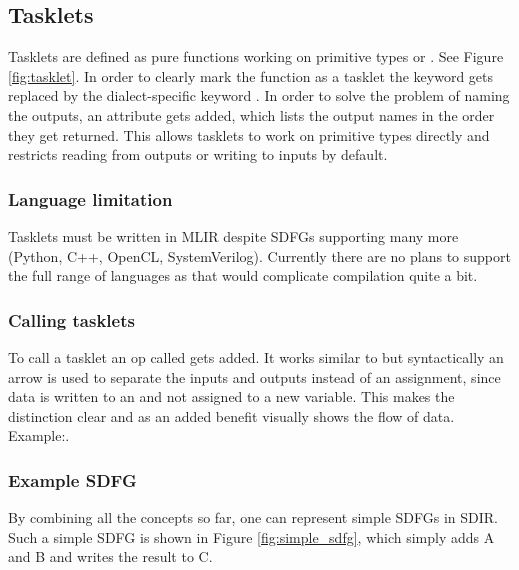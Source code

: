 \subsection{Tasklets} \label{section:tasklet}
Tasklets are defined as pure functions working on primitive types or . See Figure \ref{fig:tasklet}.
In order to clearly mark the function as a tasklet the keyword  gets replaced by the dialect-specific keyword . In order to solve the problem of naming the outputs, an attribute gets added, which lists the output names in the order they get returned. This allows tasklets to work on primitive types directly and restricts reading from outputs or writing to inputs by default.

\subsubsection{Language limitation}
Tasklets must be written in MLIR despite SDFGs supporting many more (Python, C++, OpenCL, SystemVerilog). Currently there are no plans to support the full range of languages as that would complicate compilation quite a bit.

\subsubsection{Calling tasklets}
To call a tasklet an op called  gets added. It works similar to  but syntactically an arrow is used to separate the inputs and outputs instead of an assignment, since data is written to an  and not assigned to a new variable. This makes the distinction clear and as an added benefit visually shows the flow of data. Example:.

\subsubsection{Example SDFG}
By combining all the concepts so far, one can represent simple SDFGs in SDIR. Such a simple SDFG is shown in Figure \ref{fig:simple_sdfg}, which simply adds A and B and writes the result to C.
